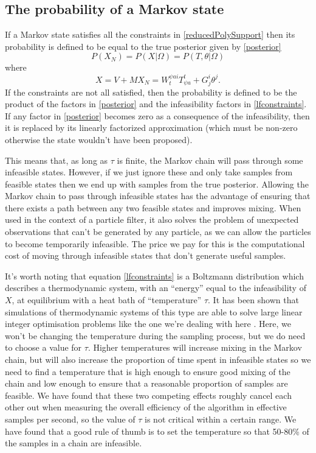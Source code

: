 \documentclass{article}
\begin{document}
\subsection{The probability of a Markov state}

If a Markov state satisfies all the constraints in \eqref{reducedPolySupport} then its probability is defined to be equal to the true posterior given by \eqref{posterior}
\[
P(X_N) = P(X|\Omega) = P(T,\theta|\Omega)
\]
where
\[
X=V + MX_N = W^{\psi a i}_{t}T^t_{\psi a} + G^i_j\theta^j.
\]
If the constraints are not all satisfied, then the probability is defined to be the product of the factors in \eqref{posterior} and the infeasibility factors in \eqref{lfconstraints}. If any factor in \eqref{posterior} becomes zero as a consequence of the infeasibility, then it is replaced by its linearly factorized approximation (which must be non-zero otherwise the state wouldn't have been proposed).

This means that, as long as $\tau$ is finite, the Markov chain will pass through some infeasible states. However, if we just ignore these and only take samples from feasible states then we end up with samples from the true posterior. Allowing the Markov chain to pass through infeasible states has the advantage of ensuring that there exists a path between any two feasible states and improves mixing. When used in the context of a particle filter, it also solves the problem of unexpected observations that can't be generated by any particle, as we can allow the particles to become temporarily infeasible. The price we pay for this is the computational cost of moving through infeasible states that don't generate useful samples.

It's worth noting that equation \eqref{lfconstraints} is a Boltzmann distribution which describes a thermodynamic system, with an ``energy'' equal to the infeasibility of $X$, at equilibrium with a heat bath of ``temperature'' $\tau$. It has been shown that simulations of thermodynamic systems of this type are able to solve large linear integer optimisation problems like the one we're dealing with here \citep{kirkpatrick1983optimization}. Here, we won't be changing the temperature during the sampling process, but we do need to choose a value for $\tau$. Higher temperatures will increase mixing in the Markov chain, but will also increase the proportion of time spent in infeasible states so we need to find a temperature that is high enough to ensure good mixing of the chain and low enough to ensure that a reasonable proportion of samples are feasible. We have found that these two competing effects roughly cancel each other out when measuring the overall efficiency of the algorithm in effective samples per second, so the value of $\tau$ is not critical within a certain range. We have found that a good rule of thumb is to set the temperature so that 50-80\% of the samples in a chain are infeasible.
\end{document}
